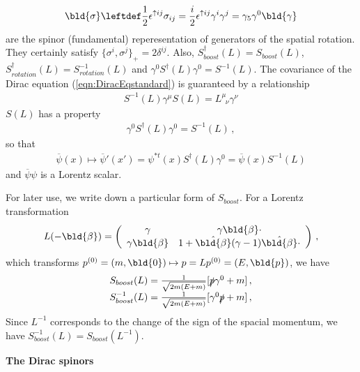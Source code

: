 \begin{eqnarray}
\bld{\sigma}  \leftdef 
\frac{1}{2} \epsilon^{\uparrow ij}\sigma_{ij}
=
\frac{i}{2} \epsilon^{\uparrow ij} \gamma^i \gamma^j
=
\gamma_5 \gamma^0 \bld{\gamma}
\label{eqn:DiGenRotation}
\end{eqnarray}
are the spinor (fundamental) reperesentation of generators of the spatial rotation.
They certainly satisfy $\{ \sigma^i, \sigma^j \}_+ = 2 \delta^{ij}$. Also,
$S^\dagger_{boost}(L) = S_{boost}(L)$,
$S^\dagger_{rotation}(L) = S^{-1}_{rotation}(L)$ and
$\gamma^0 S^\dagger_{}(L) \gamma^0 = S^{-1}_{}(L)$.
The covariance of the Dirac equation (\ref{eqn:DiracEqstandard}) is guaranteed by
a relationship
\begin{eqnarray}
S^{-1}(L) \gamma^\mu S(L) = L^\mu_{\;\;\nu} \gamma^\nu
\label{eqn:LorentzTransfgamma}
\end{eqnarray}
$S(L)$ has a property
\begin{eqnarray}
\gamma^0 S^\dagger(L) \gamma^0 = S^{-1}(L)\,,
\end{eqnarray}
so that
\begin{eqnarray}
\overline{\psi}(x) \mapsto {\overline{\psi}}'(x') = \psi^{*t} (x) S^\dagger(L) \gamma^0
= \overline{\psi}(x) S^{-1}(L)
\end{eqnarray}
and $\overline{\psi} \psi$ is a Lorentz scalar.

For later use, we write down a particular form of $S_{boost}$.
For a Lorentz transformation
\begin{eqnarray}
L(-\bld{\beta}) = \left(
\begin{array}{cc}
\gamma &
 \gamma \bld{\beta} \cdot
\\
\gamma  \bld{\beta} &
1 + \hat{\bld{\beta}} (\gamma - 1) \hat{\bld{\beta}} \cdot
\end{array}
\right)\,,
\end{eqnarray}
which transforms $p^{(0)}= (m, \bld{0}) \mapsto p = L p^{(0)} = (E, \bld{p})$,
we have
\begin{eqnarray}
\begin{array}{l}
S_{boost}(L)
=
\frac{1}{\sqrt{2m(E + m)}}
[ \slashed{p} \gamma^0 + m ]\,,
\\
S_{boost}^{-1}(L)
=
\frac{1}{\sqrt{2m(E + m)}}
[ \gamma^0 \slashed{p}  + m ]\,,
\end{array}
\end{eqnarray}
Since $L^{-1}$ corresponds to the change of the sign of the spacial momentum,
we have $S_{boost}^{-1}(L) = S_{boost}(L^{-1})$.


\bigskip
\noindent
{\bf The Dirac spinors}

